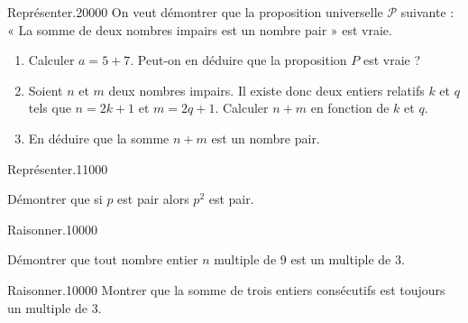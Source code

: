 \begin{pageParcoursd} 



\begin{ExoCdN}{Représenter.}{2}{0}{0}{0}{0}
On veut démontrer que la proposition universelle $\mathcal P$ suivante : « La somme de deux nombres impairs est un nombre pair » est vraie.

\begin{enumerate}
\item Calculer $a=5+7$. Peut-on en déduire que la proposition $P$
  est vraie ? %
\item Soient $n$ et $m$ deux nombres impairs. Il existe donc deux entiers
  relatifs $k$ et $q$ tels que $n=2k+1$ et $m=2q+1$.
  Calculer $n+m$ en fonction de $k$ et $q$. 
\item En déduire que la somme $n+m$ est un nombre pair. 
\end{enumerate}

\end{ExoCdN}

 
\begin{ExoCdN}{Représenter.}{1}{1}{0}{0}{0}

  
Démontrer que si $p$ est pair alors $p^2$ est pair.


 
\end{ExoCdN}

\begin{ExoCdN}{Raisonner.}{1}{0}{0}{0}{0}

Démontrer que tout nombre entier $n$ multiple de $9$ est un multiple de $3$.  

\end{ExoCdN}

\begin{ExoCdN}{Raisonner.}{1}{0}{0}{0}{0}
Montrer que la somme de trois entiers consécutifs est toujours un multiple de 3. 
\end{ExoCdN}


\end{pageParcoursd}
 
